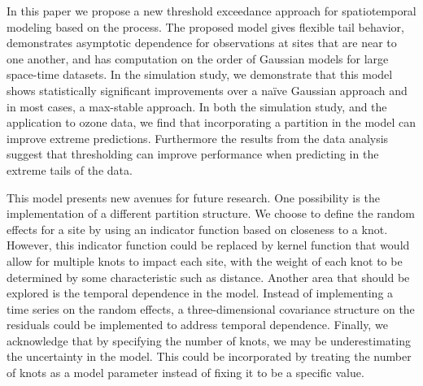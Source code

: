 In this paper we propose a new threshold exceedance approach for spatiotemporal modeling based on the \skewt{} process.
The proposed model gives flexible tail behavior, demonstrates asymptotic dependence for observations at sites that are near to one another, and has computation on the order of Gaussian models for large space-time datasets.
In the simulation study, we demonstrate that this model shows statistically significant improvements over a na\"{i}ve Gaussian approach and in most cases, a max-stable approach.
In both the simulation study, and the application to ozone data, we find that incorporating a partition in the model can improve extreme predictions.
Furthermore the results from the data analysis suggest that thresholding can improve performance when predicting in the extreme tails of the data.

This model presents new avenues for future research.
One possibility is the implementation of a different partition structure.
We choose to define the random effects for a site by using an indicator function based on closeness to a knot.
However, this indicator function could be replaced by kernel function that would allow for multiple knots to impact each site, with the weight of each knot to be determined by some characteristic such as distance.
Another area that should be explored is the temporal dependence in the model.
Instead of implementing a time series on the random effects, a three-dimensional covariance structure on the residuals could be implemented to address temporal dependence.
Finally, we acknowledge that by specifying the number of knots, we may be underestimating the uncertainty in the model.
This could be incorporated by treating the number of knots as a model parameter instead of fixing it to be a specific value.
